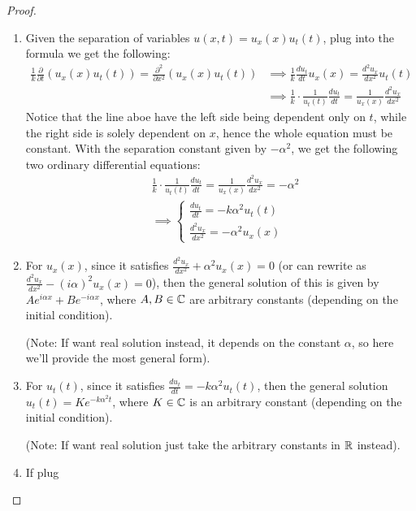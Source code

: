 \documentclass{article}
\begin{document}
\begin{proof}

    \hfil

    \begin{enumerate}
        \item Given the separation of variables $u(x,t)=u_x(x)u_t(t)$, plug into the formula we get the following:
        \begin{align}
            \frac{1}{k}\frac{\partial}{\partial t}(u_x(x)u_t(t))=\frac{\partial^2}{\partial x^2}(u_x(x)u_t(t))&\implies \frac{1}{k}\frac{d u_t}{dt}u_x(x)=\frac{d^2u_x}{dx^2}u_t(t)\\
            &\implies \frac{1}{k}\cdot \frac{1}{u_t(t)}\frac{du_t}{dt}=\frac{1}{u_x(x)}\frac{d^2u_x}{dx^2}
        \end{align}
        Notice that the line aboe have the left side being dependent only on $t$, while the right side is solely dependent on $x$, hence the whole equation must be constant. With the separation constant given by $-\alpha^2$, we get the following two ordinary differential equations:
        \begin{align}
            &\frac{1}{k}\cdot \frac{1}{u_t(t)}\frac{du_t}{dt}=\frac{1}{u_x(x)}\frac{d^2u_x}{dx^2}=-\alpha^2\\
            &\implies \begin{cases}
                \frac{du_t}{dt}=-k\alpha^2 u_t(t)\\
                \frac{d^2u_x}{dx^2}=-\alpha^2u_x(x)
            \end{cases}
        \end{align}

        \hfil

        \item For $u_x(x)$, since it satisfies $\frac{d^2u_x}{dx^2}+\alpha^2u_x(x)=0$ (or can rewrite as $\frac{d^2 u_x}{dx^2}-(i\alpha)^2 u_x(x)=0$), then the general solution of this is given by $Ae^{i\alpha x}+Be^{-i\alpha x}$, where $A,B\in\mathbb{C}$ are arbitrary constants (depending on the initial condition).
        
        (Note: If want real solution instead, it depends on the constant $\alpha$, so here we'll provide the most general form).

        \hfil
        
        \item For $u_t(t)$, since it satisfies $\frac{du_t}{dt}=-k\alpha^2 u_t(t)$, then the general solution  $u_t(t)=Ke^{-k\alpha^2 t}$, where $K\in\mathbb{C}$ is an arbitrary constant (depending on the initial condition).
        
        (Note: If want real solution just take the arbitrary constants in $\mathbb{R}$ instead).

        \hfil
        
        \item If plug
    \end{enumerate}
\end{proof}
\end{document}

